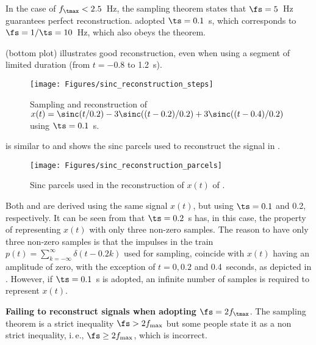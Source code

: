 In the case of $f_\tmax < 2.5$~Hz, the sampling theorem states that $\fs = 5$~Hz guarantees perfect reconstruction.
 adopted $\ts = 0.1$~s, which corresponds to $\fs = 1/\ts = 10$~Hz,
which also obeys the theorem.


 (bottom plot) illustrates good reconstruction, even when using a segment of limited duration (from $t=-0.8$ to 1.2~s).

\begin{figure}
	\centering
		\texttt{[image: Figures/sinc\_reconstruction\_steps]}		
	\caption{Sampling and reconstruction of
	$x(t) = \sinc(t/0.2) - 3\sinc((t-0.2)/0.2) + 3 \sinc((t-0.4)/0.2)$ using $\ts = 0.1$~s.\label{fig:sinc_reconstruction_steps}}
\end{figure}

 is similar to  and shows the
sinc parcels used to reconstruct the signal in .
\begin{figure}
	\centering
		\texttt{[image: Figures/sinc\_reconstruction\_parcels]}		
	\caption{Sinc parcels used in the reconstruction of $x(t)$ of .\label{fig:sinc_reconstruction_parcels}}
\end{figure}

Both  and  are derived using the same signal $x(t)$, but using $\ts=0.1$ and 0.2, respectively. It can be seen from  that $\ts=0.2$~s has, in this case, the property of representing $x(t)$ with only three non-zero samples.
The reason to have only three non-zero samples is that the impulses in the train $p(t) = \sum_{k=-\infty}^\infty \delta(t-0.2k)$ used for sampling, coincide with $x(t)$ having an amplitude of zero, with the exception of $t=0, 0.2$ and 0.4~seconds, as depicted in . However, if $\ts=0.1$~s is adopted, an infinite number of samples is required to represent $x(t)$.
\eExample

\bExample \textbf{Failing to reconstruct signals when adopting $\fs = 2 f_\tmax$}.
%
The sampling theorem is a strict inequality $\fs > 2 f_{\textrm{max}}$ but some people state it as a non strict inequality, i.\,e., $\fs \ge 2 f_{\textrm{max}}$, which is incorrect. 

